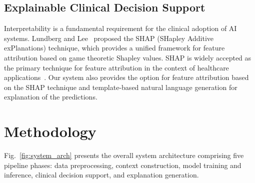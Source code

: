 \documentclass[conference]{IEEEtran}
\begin{document}
\subsection{Explainable Clinical Decision Support}

Interpretability is a fundamental requirement for the clinical adoption of AI systems. Lundberg and Lee~\cite{Lundberg2017} proposed the SHAP (SHapley Additive exPlanations) technique, which provides a unified framework for feature attribution based on game theoretic Shapley values. SHAP is widely accepted as the primary technique for feature attribution in the context of healthcare applications~\cite{Lauritsen2020}. Our system also provides the option for feature attribution based on the SHAP technique and template-based natural language generation for explanation of the predictions.

\section{Methodology}

Fig.~\ref{fig:system_arch} presents the overall system architecture comprising five pipeline phases: data preprocessing, context construction, model training and inference, clinical decision support, and explanation generation.
\end{document}
